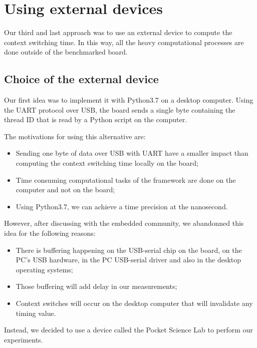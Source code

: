 \section{Using external devices \label{sec:external}}

Our third and last approach was to use an external device to compute the context switching time.
In this way, all the heavy computational processes are done outside of the benchmarked board.

\subsection{Choice of the external device}

Our first idea was to implement it with Python3.7 on a desktop computer.
Using the UART protocol over USB, the board sends a single byte containing the thread ID that is read by a Python script on the computer.

The motivations for using this alternative are:
\begin{itemize}
  \item Sending one byte of data over USB with UART have a smaller impact than computing the context switching time locally on the board;
  \item Time consuming computational tasks of the framework are done on the computer and not on the board;
  \item Using Python3.7, we can achieve a time precision at the nanosecond.
\end{itemize}

However, after discussing with the embedded community, we abandonned this idea for the following reasons:
\begin{itemize}
  \item There is buffering happening on the USB-serial chip on the board, on the PC's USB hardware, in the PC USB-serial driver 
    and also in the desktop operating systems;
  \item Those buffering will add delay in our measurements;
  \item Context switches will occur on the desktop computer that will invalidate any timing value.
\end{itemize}


Instead, we decided to use a device called the Pocket Science Lab to perform our experiments.

